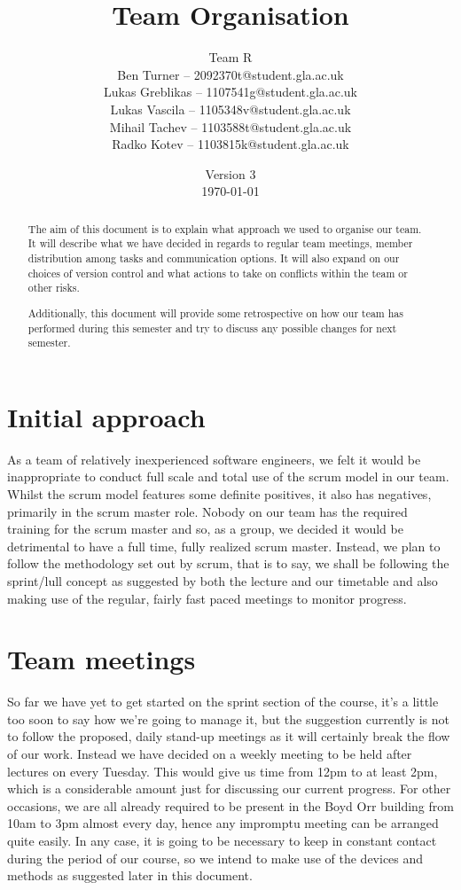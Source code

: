 \documentclass[11pt]{article}
\title{Team Organisation}
\author{Team R\\
Ben Turner -- 2092370t@student.gla.ac.uk\\
Lukas Greblikas -- 1107541g@student.gla.ac.uk\\
Lukas Vascila -- 1105348v@student.gla.ac.uk\\
Mihail Tachev -- 1103588t@student.gla.ac.uk\\
Radko Kotev -- 1103815k@student.gla.ac.uk}
\date{Version 3\\ \today}
\begin{document}
\maketitle

\begin{abstract}
The aim of this document is to explain what approach we used to 
organise our team. It will describe what we have decided in regards 
to regular team meetings, member distribution among tasks and 
communication options. It will also expand on our choices of version 
control and what actions to take on conflicts within the team or 
other risks.

Additionally, this document will provide some retrospective on how 
our team has performed during this semester and try to discuss any 
possible changes for next semester.  
\end{abstract}


\section{Initial approach}

As a team of relatively inexperienced software engineers, we felt 
it would be inappropriate to conduct full scale and total use of 
the scrum model in our team. Whilst the scrum model features some 
definite positives, it also has negatives, primarily in the scrum 
master role. Nobody on our team has the required training for the 
scrum master and so, as a group, we decided it would be detrimental 
to have a full time, fully realized scrum master. Instead, we plan 
to follow the methodology set out by scrum, that is to say, we shall 
be following the sprint/lull concept as suggested by both the 
lecture and our timetable and also making use of the regular, fairly 
fast paced meetings to monitor progress. 

\section{Team meetings}

So far we have yet to get started on the sprint section of the course, 
it’s a little too soon to say how we’re going to manage it, but the 
suggestion currently is not to follow the proposed, daily stand-up 
meetings as it will certainly break the flow of our work. Instead we 
have decided on a weekly meeting to be held after lectures on every 
Tuesday. This would give us time from 12pm to at least 2pm, which is 
a considerable amount just for discussing our current progress. For 
other occasions, we are all already required to be present in the Boyd 
Orr building from 10am to 3pm almost every day, hence any impromptu 
meeting can be arranged quite easily. In any case, it is going to be 
necessary to keep in constant contact during the period of our course, 
so we intend to make use of the devices and methods as suggested later 
in this document.
\end{document}
